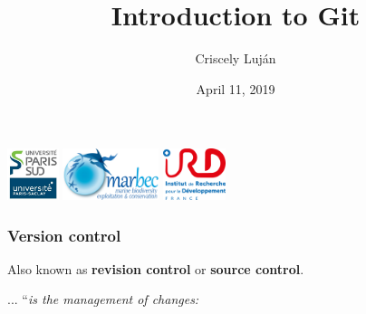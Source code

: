 \documentclass{beamer}
\title[Version control, Git and GitHub]{Introduction to Git}
\author{Criscely Luj\'{a}n}
\institute[Universit\'{e} Paris-Sud, UMR MARBEC]  
{Universit\'{e} Paris-Sud, UMR MARBEC \\ 
\medskip
\textit{criscely.lujan@ird.fr}}
\date{April 11, 2019}
\begin{document}
\begin{frame}
\titlepage 
\begin{center}
\includegraphics[height=1.5cm]{img/logo_psud.jpg}
\hspace{1em}
\includegraphics[height=1.5cm]{img/logo_marbec.png}
\hspace{1em}
\includegraphics[height=1.5cm]{img/logo_ird.png}
\end{center}
\end{frame}


\begin{frame}
\frametitle{Version control}

Also known as \textbf{revision control} or \textbf{source control}. \hfill \break

... ``\textit{is the management of changes:}

\end{frame}
\end{document}
